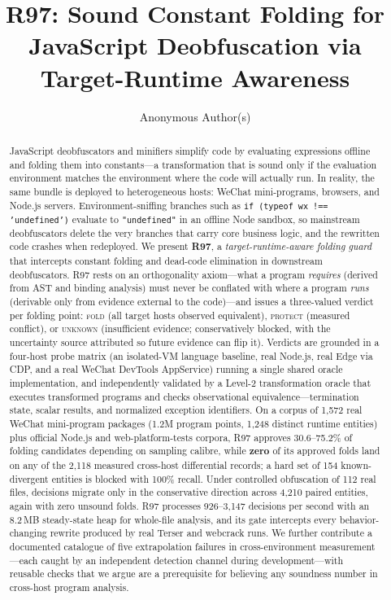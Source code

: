 \documentclass[sigconf,nonacm]{acmart}
\begin{document}
\title{R97: Sound Constant Folding for JavaScript Deobfuscation via Target-Runtime Awareness}

\author{Anonymous Author(s)}

\begin{abstract}
JavaScript deobfuscators and minifiers simplify code by evaluating expressions offline and folding them into constants---a transformation that is sound only if the evaluation environment matches the environment where the code will actually run. In reality, the same bundle is deployed to heterogeneous hosts: WeChat mini-programs, browsers, and Node.js servers. Environment-sniffing branches such as \texttt{if (typeof wx !== 'undefined')} evaluate to \texttt{"undefined"} in an offline Node sandbox, so mainstream deobfuscators delete the very branches that carry core business logic, and the rewritten code crashes when redeployed. We present \textbf{R97}, a \emph{target-runtime-aware folding guard} that intercepts constant folding and dead-code elimination in downstream deobfuscators. R97 rests on an orthogonality axiom---what a program \emph{requires} (derived from AST and binding analysis) must never be conflated with where a program \emph{runs} (derivable only from evidence external to the code)---and issues a three-valued verdict per folding point: \textsc{fold} (all target hosts observed equivalent), \textsc{protect} (measured conflict), or \textsc{unknown} (insufficient evidence; conservatively blocked, with the uncertainty source attributed so future evidence can flip it). Verdicts are grounded in a four-host probe matrix (an isolated-VM language baseline, real Node.js, real Edge via CDP, and a real WeChat DevTools AppService) running a single shared oracle implementation, and independently validated by a Level-2 transformation oracle that executes transformed programs and checks observational equivalence---termination state, scalar results, and normalized exception identifiers. On a corpus of 1{,}572 real WeChat mini-program packages (1.2M program points, 1{,}248 distinct runtime entities) plus official Node.js and web-platform-tests corpora, R97 approves 30.6--75.2\% of folding candidates depending on sampling calibre, while \textbf{zero} of its approved folds land on any of the 2{,}118 measured cross-host differential records; a hard set of 154 known-divergent entities is blocked with 100\% recall. Under controlled obfuscation of 112 real files, decisions migrate only in the conservative direction across 4{,}210 paired entities, again with zero unsound folds. R97 processes 926--3{,}147 decisions per second with an 8.2\,MB steady-state heap for whole-file analysis, and its gate intercepts every behavior-changing rewrite produced by real Terser and webcrack runs. We further contribute a documented catalogue of five extrapolation failures in cross-environment measurement---each caught by an independent detection channel during development---with reusable checks that we argue are a prerequisite for believing any soundness number in cross-host program analysis.
\end{abstract}
\end{document}
